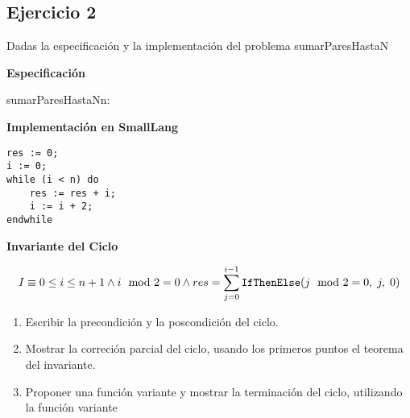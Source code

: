 \subsection{Ejercicio 2}
Dadas la especificación y la implementación del problema sumarParesHastaN

\begin{multicols}{2}
    \begin{minipage}{0.4\textwidth}
        \large\textbf{Especificación}

        \begin{proc}{sumarParesHastaN}{\In n: \ent}{\ent}
        \end{proc}
    \end{minipage}

    \begin{minipage}{0.4\textwidth}
        \large\textbf{Implementación en SmallLang}

        \begin{lstlisting}[numbers=none,frame=none,xleftmargin=0pt]
res := 0;
i := 0;
while (i < n) do
    res := res + i;
    i := i + 2;
endwhile
        \end{lstlisting}
    \end{minipage}
\end{multicols}

\large\textbf{Invariante del Ciclo}

\[I \equiv 0 \leq i \leq n + 1 \land i \mod 2 = 0 \land res = \sum_{j=0}^{i-1} \text{\normalfont\ttfamily IfThenElse}(j \mod 2 = 0,\;j,\;0)\]

\begin{enumerate}[label=\alph*)]
    \item Escribir la precondición y la poscondición del ciclo.
    \item Mostrar la correción parcial del ciclo, usando los primeros puntos el teorema del invariante.
    \item Proponer una función variante y mostrar la terminación del ciclo, utilizando la función variante
\end{enumerate}

